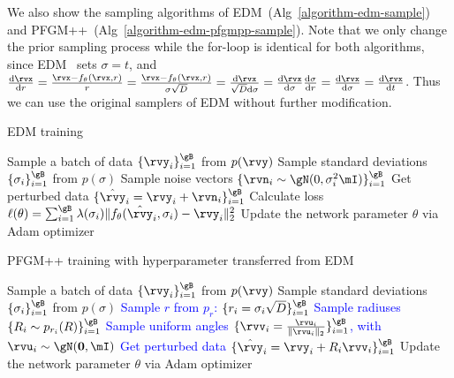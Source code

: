 We also show the sampling algorithms of EDM~(Alg~\ref{algorithm-edm-sample}) and PFGM++~(Alg~\ref{algorithm-edm-pfgmpp-sample}). Note that we only change the prior sampling process while the for-loop is identical for both algorithms, since EDM~\citep{Karras2022ElucidatingTD} sets $\sigma=t$, and $\frac{\mathrm{d}\rvx}{\mathrm{d}r}=\frac{\rvx-f_{\theta}(\rvx, r)}{r}=\frac{\rvx-f_{\theta}(\rvx, r)}{\sigma\sqrt{D}}=\frac{\mathrm{d}\rvx}{\sqrt{D}\mathrm{d}\sigma}=\frac{\mathrm{d}\rvx}{\mathrm{d}\sigma}\frac{\mathrm{d}\sigma}{\mathrm{d}r}=\frac{\mathrm{d}\rvx}{\mathrm{d}\sigma}=\frac{\mathrm{d}\rvx}{\mathrm{d}t}$. Thus we can use the original samplers of EDM without further modification.

\begin{minipage}{0.46\textwidth}
\vspace{-46pt}
\begin{algorithm}[H]
    \centering
    \caption{EDM training}\label{algorithm-edm}
    \begin{algorithmic}[1]
        \STATE Sample a batch of data $\{\rvy_i\}_{i=1}^\gB$ from $p(\rvy)$
        \STATE Sample standard deviations $\{\sigma_i\}_{i=1}^\gB$ from $p(\sigma)$ 
        \STATE Sample noise vectors $\{\rvn_i \sim \gN(0, \sigma_i^2 \mI)\}_{i=1}^\gB$
        \STATE Get perturbed data $\{\hat{\rvy}_i = \rvy_i + \rvn_i\}_{i=1}^\gB$
        \STATE Calculate loss $\ell(\theta) =  \sum_{i=1}^\gB \lambda (\sigma_i)\|f_\theta(\hat{\rvy}_i, \sigma_i)-\rvy_i\|_2^2$
        \STATE Update the network parameter $\theta$ via Adam optimizer
    \end{algorithmic}
\end{algorithm}
\end{minipage}
\hfill
\begin{minipage}{0.50\textwidth}
\begin{algorithm}[H]
    \centering
    \caption{PFGM++ training with hyperparameter transferred from EDM}\label{algorithm-edm-pfgmpp}
    \begin{algorithmic}[1]
        \STATE Sample a batch of data $\{\rvy_i\}_{i=1}^\gB$ from $p(\rvy)$
        \STATE Sample standard deviations $\{\sigma_i\}_{i=1}^\gB$ from $p(\sigma)$ 
        \STATE \textcolor{blue}{Sample $r$ from $p_r$: $\{r_i = \sigma_i\sqrt{D}\}_{i=1}^\gB$}
        \STATE  \textcolor{blue}{Sample radiuses $\{R_i \sim p_{r_i}(R)\}_{i=1}^\gB$}
        \STATE  \textcolor{blue}{Sample uniform angles $\{\rvv_i =\frac{\rvu_i}{\|\rvu_i\|_2}\}_{i=1}^\gB$, with $\rvu_i \sim \gN(\bf{0}, \mI)$}
        \STATE \textcolor{blue}{Get perturbed data $\{\hat{\rvy}_i = \rvy_i + R_i\rvv_i\}_{i=1}^\gB$}
        \STATE Update the network parameter $\theta$ via Adam optimizer
    \end{algorithmic}
\end{algorithm}
\end{minipage}

